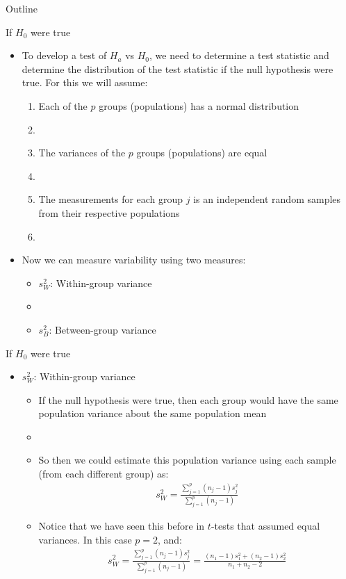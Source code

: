 \documentclass[xcolor=dvipsnames]{beamer}
\begin{document}
\begin{frame}{Outline}
	\tableofcontents[currentsection,subsectionstyle=show/shaded/hide]
\end{frame}

\begin{frame}{If $H_0$ were true}
	\begin{itemize}
		\item To develop a test of $H_a$ vs $H_0$, we need to determine a test statistic and determine the distribution of the test statistic if the null hypothesis were true. For this we will assume: \pause
		\begin{enumerate}
			\item Each of the $p$ groups (populations) has a normal distribution \pause
			\item[]
			\item The variances of the $p$ groups (populations) are equal \pause
			\item[]
			\item The measurements for each group $j$ is an independent random samples from their respective populations \pause
			\item[]
		\end{enumerate}
	\item Now we can measure variability using two measures: \pause
	\begin{itemize}
		\item $s_W^2$: Within-group variance \pause
		\item[]
		\item $s_B^2$: Between-group variance 
	\end{itemize}
	\end{itemize}
\end{frame}

\begin{frame}{If $H_0$ were true}
	\begin{itemize}
		\item $s_W^2$: Within-group variance \pause
		\begin{itemize}
			\item If the null hypothesis were true, then each group would have the same population variance about the same population mean \pause
			\item[]
			\item So then we could estimate this population variance using each sample (from each different group) as: \pause
			\begin{gather*}
				s_W^2 = \frac{\sum_{j=1}^p (n_j -1) s_j^2}{\sum_{j=1}^p (n_j - 1)}
			\end{gather*}\pause
			\item Notice that we have seen this before in $t$-tests that assumed equal variances. In this case $p=2$, and: \pause
			\begin{gather*}
			s_W^2 = \frac{\sum_{j=1}^p (n_j -1) s_j^2}{\sum_{j=1}^p (n_j - 1)} = \frac{(n_1-1) s_1^2 + (n_2 -1) s_2^2}{n_1 + n_2 -2}
			\end{gather*}
		\end{itemize}
	\end{itemize}
\end{frame}
\end{document}
